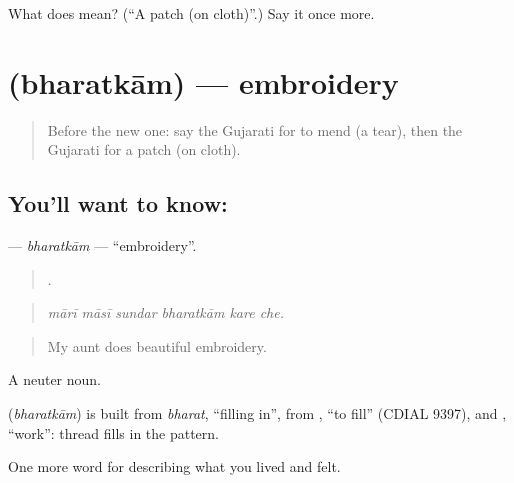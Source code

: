 \begin{tcolorbox}[breakable,colback=teal!4,colframe=teal!35!black,title={Before you move on}]
What does  mean? (\textquotedblleft{}A patch (on cloth)\textquotedblright{}.) Say it once more.
\end{tcolorbox}
\section[\texorpdfstring{\gu{ભરતકામ} (bharatkām)}{ભરતકામ (bharatkām)}]{ (bharatkām) — embroidery}

\label{lesson:GU-C507-bharatkam}



\begin{quote}
Before the new one: say the Gujarati for to mend (a tear), then the Gujarati for a patch (on cloth).
\end{quote}

\subsection*{You'll want to know: }
\textbf{} — \emph{bharatkām} — \textquotedblleft{}embroidery\textquotedblright{}.

\begin{quote}
     .
\end{quote}

\begin{quote}
\emph{mārī māsī sundar bharatkām kare che.}
\end{quote}

\begin{quote}
My aunt does beautiful embroidery.
\end{quote}

A neuter noun.

\begin{cousinweb}
\textbf{} (\emph{bharatkām}) is built from \emph{bharat}, \textquotedblleft{}filling in\textquotedblright{}, from \textbf{}, \textquotedblleft{}to fill\textquotedblright{} (CDIAL 9397), and \textbf{}, \textquotedblleft{}work\textquotedblright{}: thread fills in the pattern.
\end{cousinweb}

\begin{grammarlens}[title={What you've built}]
One more word for describing what you lived and felt.
\end{grammarlens}


